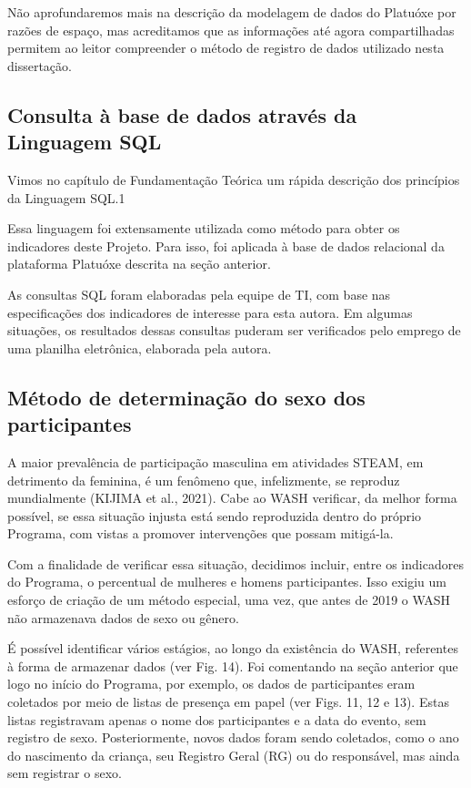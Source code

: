 Não aprofundaremos mais na descrição da modelagem de dados do Platuóxe por razões de espaço, mas acreditamos que as informações até agora compartilhadas permitem ao leitor compreender o método de registro de dados utilizado nesta dissertação.

\subsection[Consulta à base de dados através da Linguagem SQL]{Consulta à base de dados através da Linguagem SQL}\label{Consulta à base de dados através da Linguagem SQL}
Vimos no capítulo de Fundamentação Teórica um rápida descrição dos princípios da Linguagem SQL.1

Essa linguagem foi extensamente utilizada como método para obter os indicadores deste Projeto. Para isso, foi aplicada à base de dados relacional da plataforma Platuóxe descrita na seção anterior.

As consultas SQL foram elaboradas pela equipe de TI, com base nas especificações dos indicadores de interesse para esta autora. Em algumas situações, os resultados dessas consultas puderam ser verificados pelo emprego de uma planilha eletrônica, elaborada pela autora.

\subsection[Método de determinação do sexo dos participantes]{Método de determinação do sexo dos participantes}\label{Método de determinação do sexo dos participantes}
A maior prevalência de participação masculina em atividades STEAM, em detrimento da feminina, é um fenômeno que, infelizmente, se reproduz mundialmente (KIJIMA et al., 2021). Cabe ao WASH verificar, da melhor forma possível, se essa situação injusta está sendo reproduzida dentro do próprio Programa, com vistas a promover intervenções que possam mitigá-la.

Com a finalidade de verificar essa situação, decidimos incluir, entre os indicadores do Programa, o percentual de mulheres e homens participantes. Isso exigiu um esforço de criação de um método especial, uma vez, que antes de 2019 o WASH não armazenava dados de sexo ou gênero.

É possível identificar vários estágios, ao longo da existência do WASH, referentes à forma de armazenar dados (ver Fig. 14). Foi comentando na seção anterior que logo no início do Programa, por exemplo, os dados de participantes eram coletados por meio de listas de presença em papel (ver Figs. 11, 12 e 13). Estas listas registravam apenas o nome dos participantes e a data do evento, sem registro de sexo. Posteriormente, novos dados foram sendo coletados, como o ano do nascimento da criança, seu Registro Geral (RG) ou do responsável, mas ainda sem registrar o sexo.


